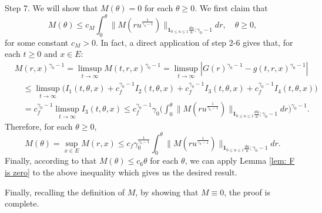 \documentclass[12pt, a4paper]{amsart}
\theoremstyle{definition}
\numberwithin{equation}{section}
\begin{document}
	Step 7. We will show that $M(\theta) = 0$ for each $\theta \geq 0$.
	We first claim that
\[
	M(\theta)
	\leq c_M\int_0^\theta  \big\| M(r u^{\frac{1}{\gamma_0 - 1}}) \big\|_{\mathbf 1_{0\leq u\leq 1}\frac{du}{u};\gamma_0 - 1}  dr ,
	\quad \theta \geq 0,
\]
	for some constant $c_M > 0$.
	In fact, a direct application of step 2-6 gives that, for each $t\geq 0$ and $x\in E$:
\[\begin{split}
	&M(r,x)^{\gamma_0 - 1}
	=\limsup_{t\to \infty} M(t,r,x)^{\gamma_0 - 1}
	= \limsup_{t\to \infty}|G(r)^{\gamma_0 - 1} - g(t,r,x)^{\gamma_0 - 1}|
	\\&\quad \leq \limsup_{t\to \infty} \big( I_1(t,\theta,x) +c^{\gamma_0 - 1}_f I_2(t,\theta,x) +c^{\gamma_0 - 1}_f I_3(t,\theta,x) + c^{\gamma_0 - 1}_f I_4(t,\theta,x) \big)
	\\& \quad = c_f^{\gamma_0 - 1} \limsup_{t\to \infty} I_3(t,\theta ,x)
	\leq c_f^{\gamma_0 - 1} \gamma_0 \Big(  \int_0^\theta  \big\| M(r u^{\frac{1}{\gamma_0 - 1}}) \big\|_{\mathbf 1_{0\leq u\leq 1}\frac{du}{u};\gamma_0 - 1}  dr\Big)^{\gamma_0 - 1}.
\end{split}\]
	Therefore, for each $\theta \geq 0$,
\[
	M(\theta)
	= \sup_{x\in E}  M(r,x)
	\leq c_f \gamma_0^{\frac{1}{\gamma_0 - 1}} \int_0^\theta  \big\| M(r u^{\frac{1}{\gamma_0 - 1}}) \big\|_{\mathbf 1_{0\leq u\leq 1}\frac{du}{u};\gamma_0 - 1}  dr.
\]
	Finally, according to that $M(\theta) \leq c_6 \theta$ for each $\theta$, we can apply Lemma \ref{lem: F is zero} to the above inequality which gives us the desired result.
	
	Finally, recalling the definition of $M$, by showing that $M\equiv 0$, the proof is complete.
\end{document}
